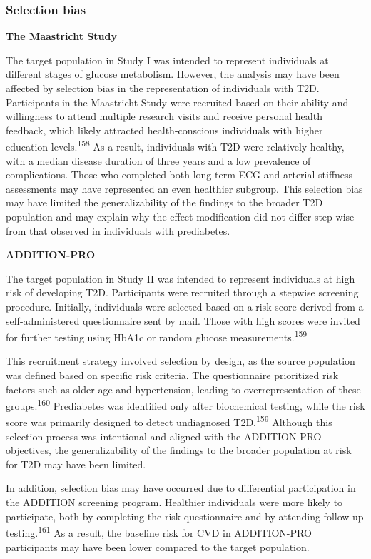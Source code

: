 \documentclass[
  letterpaper,
  headsepline=true,
  open=any]{scrbook}
\begin{document}
\hypertarget{selection-bias}{%
\subsubsection{Selection bias}\label{selection-bias}}

\textbf{The Maastricht Study}

The target population in Study I was intended to represent individuals
at different stages of glucose metabolism. However, the analysis may
have been affected by selection bias in the representation of
individuals with T2D. Participants in the Maastricht Study were
recruited based on their ability and willingness to attend multiple
research visits and receive personal health feedback, which likely
attracted health-conscious individuals with higher education
levels.\textsuperscript{158} As a result, individuals with T2D were
relatively healthy, with a median disease duration of three years and a
low prevalence of complications. Those who completed both long-term ECG
and arterial stiffness assessments may have represented an even
healthier subgroup. This selection bias may have limited the
generalizability of the findings to the broader T2D population and may
explain why the effect modification did not differ step-wise from that
observed in individuals with prediabetes.

\textbf{ADDITION-PRO}

The target population in Study II was intended to represent individuals
at high risk of developing T2D. Participants were recruited through a
stepwise screening procedure. Initially, individuals were selected based
on a risk score derived from a self-administered questionnaire sent by
mail. Those with high scores were invited for further testing using
HbA1c or random glucose measurements.\textsuperscript{159}

This recruitment strategy involved selection by design, as the source
population was defined based on specific risk criteria. The
questionnaire prioritized risk factors such as older age and
hypertension, leading to overrepresentation of these
groups.\textsuperscript{160} Prediabetes was identified only after
biochemical testing, while the risk score was primarily designed to
detect undiagnosed T2D.\textsuperscript{159} Although this selection
process was intentional and aligned with the ADDITION-PRO objectives,
the generalizability of the findings to the broader population at risk
for T2D may have been limited.

In addition, selection bias may have occurred due to differential
participation in the ADDITION screening program. Healthier individuals
were more likely to participate, both by completing the risk
questionnaire and by attending follow-up testing.\textsuperscript{161}
As a result, the baseline risk for CVD in ADDITION-PRO participants may
have been lower compared to the target population.
\end{document}

